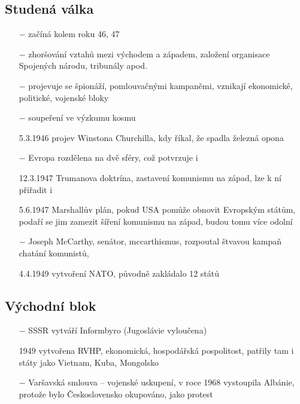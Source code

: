 \documentclass{article}
\begin{document}
\subsection*{Studená válka}
\begin{itemize}
    \vspace{-0.5em}
    \setlength\itemsep{0.15em}
    \item[$-$] začíná kolem roku 46, 47
    \item[$-$] zhoršování vztahů mezi východem a západem, založení organisace Spojených národu, tribunály apod.
    \item[$-$] projevuje se špionáží, pomlouvačnými kampaněmi, vznikají ekonomické, politické, vojenské bloky
    \item[$-$] soupeření ve výzkumu kosmu
    \item[5.3.1946] projev Winstona Churchilla, kdy říkal, že spadla železná opona
    \item[$-$] Evropa rozdělena na dvě sféry, což potvrzuje i
    \item[12.3.1947] Trumanova doktrína, zastavení komunismu na západ, lze k ní přiřadit i
    \item[5.6.1947] Marshallův plán, pokud USA pomůže obnovit Evropským státům, podaří se jim zamezit šíření komunismu na západ, budou tomu více odolní
    \item[$-$] Joseph McCarthy, senátor, mccarthismus, rozpoutal štvavou kampaň chatání komunistů, 
    \item[4.4.1949] vytvoření NATO, původně zakládalo 12 států
\end{itemize}

\subsection*{Východní blok}
\begin{itemize}
    \vspace{-0.5em}
    \setlength\itemsep{0.15em}
    \item[$-$] SSSR vytváří Informbyro (Jugoslávie vyloučena)
    \item[1949] vytvořena RVHP, ekonomická, hospodářská pospolitost, patřily tam i státy jako Vietnam, Kuba, Mongolsko
    \item[$-$] Varšavská smlouva -- vojenské uskupení, v roce 1968 vystoupila Albánie, protože bylo Československo okupováno, jako protest
\end{itemize}
\end{document}
